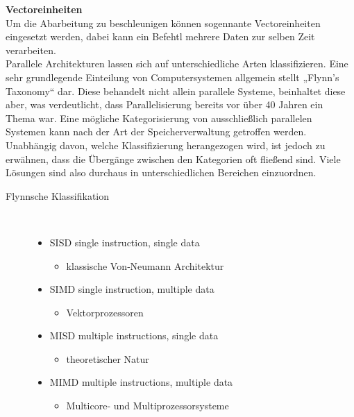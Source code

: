 \documentclass[a4paper,12pt]{article}
\begin{document}
\textbf{Vectoreinheiten\\}
Um die Abarbeitung zu beschleunigen können sogennante Vectoreinheiten eingesetzt werden, dabei kann ein Befehtl mehrere Daten zur selben Zeit verarbeiten.\\
Parallele Architekturen lassen sich auf unterschiedliche Arten klassifizieren. Eine sehr grundlegende Einteilung von Computersystemen allgemein stellt „Flynn’s Taxonomy“ dar. Diese behandelt nicht allein parallele Systeme, beinhaltet diese aber, was verdeutlicht, dass Parallelisierung bereits vor über 40 Jahren ein Thema war.
\newpage
\noindent
Eine mögliche Kategorisierung von ausschließlich parallelen Systemen kann nach der Art der Speicherverwaltung getroffen werden.
Unabhängig davon, welche Klassifizierung herangezogen wird, ist jedoch zu erwähnen, dass die Übergänge zwischen den Kategorien oft fließend sind. Viele Lösungen sind also durchaus in unterschiedlichen Bereichen einzuordnen.
\begin{description}
    \item[Flynnsche Klassifikation] ~\par
    \begin{itemize}
        \item SISD single instruction, single data
        \begin{itemize}
            \item{klassische Von‑Neumann Architektur}
        \end{itemize}
        \item SIMD single instruction, multiple data
        \begin{itemize}
            \item{Vektorprozessoren}
        \end{itemize}
        \item MISD multiple instructions, single data
        \begin{itemize}
            \item{theoretischer Natur}
        \end{itemize}
        \item MIMD multiple instructions, multiple data
        \begin{itemize}
            \item{Multicore‑ und Multiprozessorsysteme\\\\}
        \end{itemize}
    \end{itemize} 
\end{description}
\end{document}
